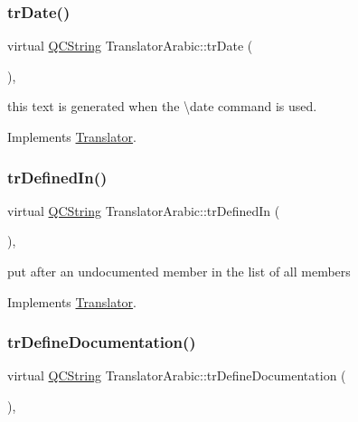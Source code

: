 \subsubsection{\texorpdfstring{trDate()}{trDate()}}
{\footnotesize\ttfamily virtual \mbox{\hyperlink{class_q_c_string}{Q\+C\+String}} Translator\+Arabic\+::tr\+Date (\begin{DoxyParamCaption}{ }\end{DoxyParamCaption})\hspace{0.3cm}{\ttfamily [inline]}, {\ttfamily [virtual]}}

this text is generated when the \textbackslash{}date command is used. 

Implements \mbox{\hyperlink{class_translator}{Translator}}.

\mbox{\label{class_translator_arabic_a58eecd6376efdc45deb1b9154c7130e1}} 
\subsubsection{\texorpdfstring{trDefinedIn()}{trDefinedIn()}}
{\footnotesize\ttfamily virtual \mbox{\hyperlink{class_q_c_string}{Q\+C\+String}} Translator\+Arabic\+::tr\+Defined\+In (\begin{DoxyParamCaption}{ }\end{DoxyParamCaption})\hspace{0.3cm}{\ttfamily [inline]}, {\ttfamily [virtual]}}

put after an undocumented member in the list of all members 

Implements \mbox{\hyperlink{class_translator}{Translator}}.

\mbox{\label{class_translator_arabic_aa367047c22e78f701ae4e151a57983ab}} 
\subsubsection{\texorpdfstring{trDefineDocumentation()}{trDefineDocumentation()}}
{\footnotesize\ttfamily virtual \mbox{\hyperlink{class_q_c_string}{Q\+C\+String}} Translator\+Arabic\+::tr\+Define\+Documentation (\begin{DoxyParamCaption}{ }\end{DoxyParamCaption})\hspace{0.3cm}{\ttfamily [inline]}, {\ttfamily [virtual]}}

